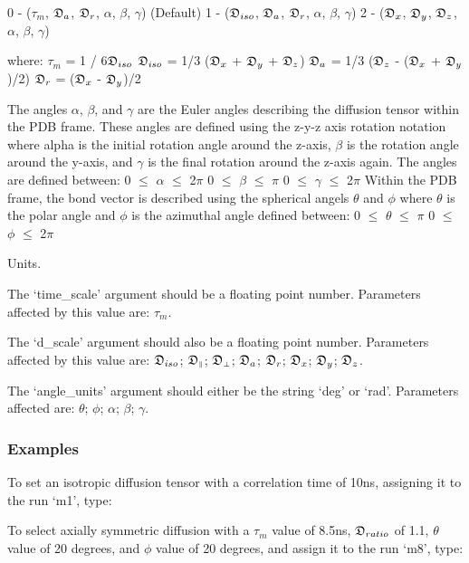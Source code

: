     0 - ($\tau_m$, $\mathfrak{D}_a$, $\mathfrak{D}_r$, $\alpha$, $\beta$, $\gamma$)   (Default)
    1 - ($\mathfrak{D}_{iso}$, $\mathfrak{D}_a$, $\mathfrak{D}_r$, $\alpha$, $\beta$, $\gamma$)
    2 - ($\mathfrak{D}_x$, $\mathfrak{D}_y$, $\mathfrak{D}_z$, $\alpha$, $\beta$, $\gamma$)

where:
    $\tau_m$ = 1 / 6$\mathfrak{D}_{iso}$
    $\mathfrak{D}_{iso}$ = 1/3 ($\mathfrak{D}_x$ + $\mathfrak{D}_y$ + $\mathfrak{D}_z$)
    $\mathfrak{D}_a$ = 1/3 ($\mathfrak{D}_z$ - ($\mathfrak{D}_x$ + $\mathfrak{D}_y$)/2)
    $\mathfrak{D}_r$ = ($\mathfrak{D}_x$ - $\mathfrak{D}_y$)/2

The angles $\alpha$, $\beta$, and $\gamma$ are the Euler angles describing the diffusion tensor
within the PDB frame.  These angles are defined using the z-y-z axis rotation notation where
alpha is the initial rotation angle around the z-axis, $\beta$ is the rotation angle around the
y-axis, and $\gamma$ is the final rotation around the z-axis again.  The angles are defined
between:
    0 $\le$ $\alpha$ $\le$ 2$\pi$
    0 $\le$ $\beta$ $\le$ $\pi$
    0 $\le$ $\gamma$ $\le$ 2$\pi$
Within the PDB frame, the bond vector is described using the spherical angels $\theta$ and $\phi$
where $\theta$ is the polar angle and $\phi$ is the azimuthal angle defined between:
    0 $\le$ $\theta$ $\le$ $\pi$
    0 $\le$ $\phi$ $\le$ 2$\pi$


Units.

The `time\_scale' argument should be a floating point number.  Parameters affected by this
value are:  $\tau_m$.

The `d\_scale' argument should also be a floating point number.  Parameters affected by this
value are:  $\mathfrak{D}_{iso}$; $\mathfrak{D}_{\scriptscriptstyle \parallel}$; $\mathfrak{D}_{\scriptscriptstyle \perp}$; $\mathfrak{D}_a$; $\mathfrak{D}_r$; $\mathfrak{D}_x$; $\mathfrak{D}_y$; $\mathfrak{D}_z$.

The `angle\_units' argument should either be the string `deg' or `rad'.  Parameters affected
are:  $\theta$; $\phi$; $\alpha$; $\beta$; $\gamma$.



\subsubsection{Examples}

To set an isotropic diffusion tensor with a correlation time of 10ns, assigning it to the
run `m1', type:



To select axially symmetric diffusion with a $\tau_m$ value of 8.5ns, $\mathfrak{D}_{ratio}$ of 1.1, $\theta$ value
of 20 degrees, and $\phi$ value of 20 degrees, and assign it to the run `m8', type:

